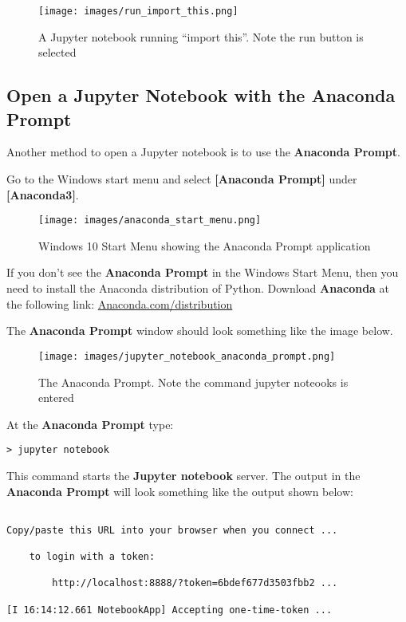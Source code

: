 \documentclass{book}
\makeatletter
\def\maxwidth{\ifdim\Gin@nat@width>\linewidth\linewidth
\else\Gin@nat@width\fi}
\let\Oldincludegraphics\includegraphics
\renewcommand{\includegraphics}[1]{\Oldincludegraphics[width=.8\maxwidth]{#1}}
\makeatother
\begin{document}
\begin{figure}
\centering
\texttt{[image: images/run\_import\_this.png]}
\caption{A Jupyter notebook running ``import this''. Note the run button
is selected}
\end{figure}
    




    
        \hypertarget{open-a-jupyter-notebook-with-the-anaconda-prompt}{%
\subsection{Open a Jupyter Notebook with the Anaconda
Prompt}\label{open-a-jupyter-notebook-with-the-anaconda-prompt}}
    




    
        Another method to open a Jupyter notebook is to use the \textbf{Anaconda
Prompt}.

Go to the Windows start menu and select \textbf{{[}Anaconda Prompt{]}}
under \textbf{{[}Anaconda3{]}}.

\begin{figure}
\centering
\texttt{[image: images/anaconda\_start\_menu.png]}
\caption{Windows 10 Start Menu showing the Anaconda Prompt application}
\end{figure}

If you don't see the \textbf{Anaconda Prompt} in the Windows Start Menu,
then you need to install the Anaconda distribution of Python. Download
\textbf{Anaconda} at the following link:
\href{https://www.anaconda.com/distribution/}{Anaconda.com/distribution}

The \textbf{Anaconda Prompt} window should look something like the image
below.

\begin{figure}
\centering
\texttt{[image: images/jupyter\_notebook\_anaconda\_prompt.png]}
\caption{The Anaconda Prompt. Note the command jupyter noteooks is
entered}
\end{figure}

At the \textbf{Anaconda Prompt} type:

\begin{lstlisting}
> jupyter notebook
\end{lstlisting}

This command starts the \textbf{Jupyter notebook} server. The output in
the \textbf{Anaconda Prompt} will look something like the output shown
below:

\begin{lstlisting}

Copy/paste this URL into your browser when you connect ...

    to login with a token:

        http://localhost:8888/?token=6bdef677d3503fbb2 ...

[I 16:14:12.661 NotebookApp] Accepting one-time-token ...
\end{lstlisting}
\end{document}
